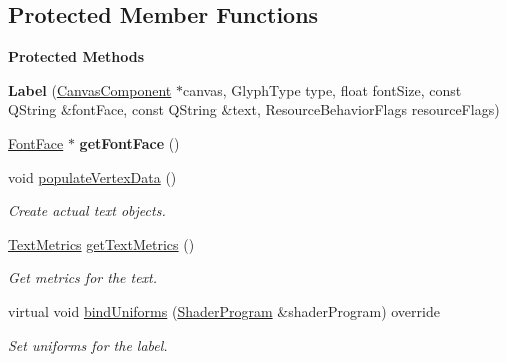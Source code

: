 \subsection*{Protected Member Functions}
\begin{Indent}\textbf{ Protected Methods}\par
\begin{DoxyCompactItemize}
\item 
\mbox{\label{classrev_1_1_label_a4d778a4986f4b02bbb4f99deb87e543d}} 
{\bfseries Label} (\mbox{\hyperlink{classrev_1_1_canvas_component}{Canvas\+Component}} $\ast$canvas, Glyph\+Type type, float font\+Size, const Q\+String \&font\+Face, const Q\+String \&text, Resource\+Behavior\+Flags resource\+Flags)
\item 
\mbox{\label{classrev_1_1_label_a483c7b4092b87fb8b34923730e92cee0}} 
\mbox{\hyperlink{classrev_1_1_font_face}{Font\+Face}} $\ast$ {\bfseries get\+Font\+Face} ()
\item 
\mbox{\label{classrev_1_1_label_a69140aba47da9a663804e03ab1e43b73}} 
void \mbox{\hyperlink{classrev_1_1_label_a69140aba47da9a663804e03ab1e43b73}{populate\+Vertex\+Data}} ()
\begin{DoxyCompactList}\small\item\em Create actual text objects. \end{DoxyCompactList}\item 
\mbox{\label{classrev_1_1_label_abba32137dd0229b860053cd28740b3fc}} 
\mbox{\hyperlink{structrev_1_1_label_1_1_text_metrics}{Text\+Metrics}} \mbox{\hyperlink{classrev_1_1_label_abba32137dd0229b860053cd28740b3fc}{get\+Text\+Metrics}} ()
\begin{DoxyCompactList}\small\item\em Get metrics for the text. \end{DoxyCompactList}\item 
\mbox{\label{classrev_1_1_label_a367f275d61fa940760fe254a526ecc7b}} 
virtual void \mbox{\hyperlink{classrev_1_1_label_a367f275d61fa940760fe254a526ecc7b}{bind\+Uniforms}} (\mbox{\hyperlink{classrev_1_1_shader_program}{Shader\+Program}} \&shader\+Program) override
\begin{DoxyCompactList}\small\item\em Set uniforms for the label. \end{DoxyCompactList}\item 

\end{DoxyCompactItemize}
\end{Indent}
